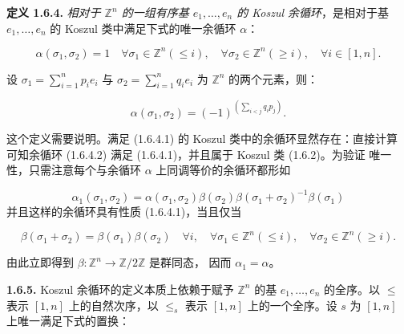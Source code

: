 \clearpage
{}%
\noindent\textbf{定义 1.6.4.}\quad
\emph{相对于 $\mathbb Z^n$ 的一组有序基 $e_1,\ldots,e_n$ 的 Koszul
余循环}，是相对于基 $e_1,\ldots,e_n$ 的 Koszul 类中满足下式的唯一余循环
$\alpha$：

\begin{equation}
  \alpha(\sigma_1,\sigma_2)=1
  \quad
  \forall\sigma_1\in\mathbb Z^n(\leq i),\quad
  \forall\sigma_2\in\mathbb Z^n(\geq i),\quad
  \forall i\in[1,n].
  \tag{1.6.4.1}
\end{equation}

设
$\sigma_1=\sum_{i=1}^{n}p_i e_i$ 与
$\sigma_2=\sum_{i=1}^{n}q_i e_i$
为 $\mathbb Z^n$ 的两个元素，则：

\begin{equation}
  \alpha(\sigma_1,\sigma_2)
  =(-1)^{\left(\sum_{i<j}q_i p_j\right)}.
  \tag{1.6.4.2}
\end{equation}

这个定义需要说明。满足 (1.6.4.1) 的 Koszul 类中的余循环显然存在：直接计算
可知余循环 (1.6.4.2) 满足 (1.6.4.1)，并且属于 Koszul 类 (1.6.2)。为验证
唯一性，只需注意每个与余循环 $\alpha$ 上同调等价的余循环都形如

\begin{equation*}
  \alpha_1(\sigma_1,\sigma_2)
  =\alpha(\sigma_1,\sigma_2)
   \beta(\sigma_2)\beta(\sigma_1+\sigma_2)^{-1}\beta(\sigma_1)
\end{equation*}
并且这样的余循环具有性质 (1.6.4.1)，当且仅当

\begin{equation*}
  \beta(\sigma_1+\sigma_2)=\beta(\sigma_1)\beta(\sigma_2)
  \quad
  \forall i,\quad
  \forall\sigma_1\in\mathbb Z^n(\leq i),\quad
  \forall\sigma_2\in\mathbb Z^n(\geq i).
\end{equation*}

由此立即得到 $\beta\colon\mathbb Z^n\to\mathbb Z/2\mathbb Z$ 是群同态，
因而 $\alpha_1=\alpha$。

\noindent\textbf{1.6.5.}\quad
Koszul 余循环的定义本质上依赖于赋予 $\mathbb Z^n$ 的基
$e_1,\ldots,e_n$ 的全序。以 $\leq$ 表示 $[1,n]$ 上的自然次序，以
$\leq_s$ 表示 $[1,n]$ 上的一个全序。设 $s$ 为 $[1,n]$ 上唯一满足下式的置换：

